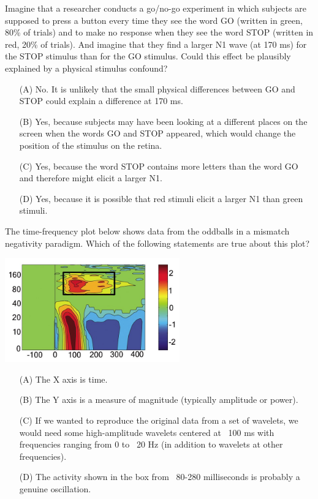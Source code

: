 \documentclass[a4 paper]{article}
\begin{document}
\begin{tcolorbox}[colback=RubineRed!5!white,colframe=RubineRed!75!black]
Imagine that a researcher conducts a go/no-go experiment in which subjects are supposed to press a button every time they see the word GO (written in green, 80\% of trials) and to make no response when they see the word STOP (written in red, 20\% of trials). And imagine that they find a larger N1 wave (at 170 ms) for the STOP stimulus than for the GO stimulus. Could this effect be plausibly explained by a physical stimulus confound? 
\begin{itemize}
    \item[(A)]No. It is unlikely that the small physical differences between GO and STOP could explain a difference at 170 ms.
    \item[(B)]Yes, because subjects may have been looking at a different places on the screen when the words GO and STOP appeared, which would change the position of the stimulus on the retina.
    \item[(C)]Yes, because the word STOP contains more letters than the word GO and therefore might elicit a larger N1.
    \item[(D)] Yes, because it is possible that red stimuli elicit a larger N1 than green stimuli.
\end{itemize}
\end{tcolorbox}
\begin{tcolorbox}[colback=RubineRed!5!white,colframe=RubineRed!75!black]
The time-frequency plot below shows data from the oddballs in a mismatch negativity paradigm. Which of the following statements are true about this plot? 
\begin{multicols*}{2}
\begin{center}
    \includegraphics[height=4.5cm]{figure/Time-Frequency.png}
\end{center}
\columnbreak
\begin{itemize}
    \item[(A)] The X axis is time.
    \item[(B)] The Y axis is a measure of magnitude (typically amplitude or power).
    \item[(C)] If we wanted to reproduce the original data from a set of wavelets, we would need some high-amplitude wavelets centered at ~100 ms with frequencies ranging from 0 to ~20 Hz (in addition to wavelets at other frequencies).
    \item[(D)] The activity shown in the box from ~80-280 milliseconds is probably a genuine oscillation.
\end{itemize}
\end{multicols*}
\end{tcolorbox}
\end{document}
